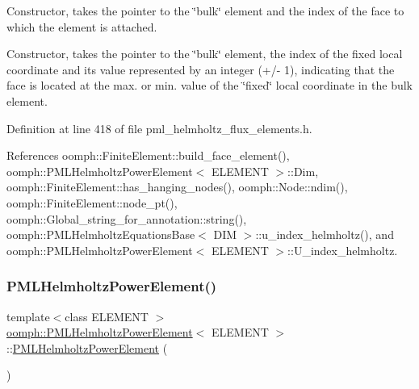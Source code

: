 Constructor, takes the pointer to the \char`\"{}bulk\char`\"{} element and the index of the face to which the element is attached. 

Constructor, takes the pointer to the \char`\"{}bulk\char`\"{} element, the index of the fixed local coordinate and its value represented by an integer (+/-\/ 1), indicating that the face is located at the max. or min. value of the \char`\"{}fixed\char`\"{} local coordinate in the bulk element. 

Definition at line 418 of file pml\+\_\+helmholtz\+\_\+flux\+\_\+elements.\+h.



References oomph\+::\+Finite\+Element\+::build\+\_\+face\+\_\+element(), oomph\+::\+P\+M\+L\+Helmholtz\+Power\+Element$<$ E\+L\+E\+M\+E\+N\+T $>$\+::\+Dim, oomph\+::\+Finite\+Element\+::has\+\_\+hanging\+\_\+nodes(), oomph\+::\+Node\+::ndim(), oomph\+::\+Finite\+Element\+::node\+\_\+pt(), oomph\+::\+Global\+\_\+string\+\_\+for\+\_\+annotation\+::string(), oomph\+::\+P\+M\+L\+Helmholtz\+Equations\+Base$<$ D\+I\+M $>$\+::u\+\_\+index\+\_\+helmholtz(), and oomph\+::\+P\+M\+L\+Helmholtz\+Power\+Element$<$ E\+L\+E\+M\+E\+N\+T $>$\+::\+U\+\_\+index\+\_\+helmholtz.

\mbox{\label{classoomph_1_1PMLHelmholtzPowerElement_a84f1714b98197b3f22b5784cd682fb29}} 
\subsubsection{\texorpdfstring{P\+M\+L\+Helmholtz\+Power\+Element()}{PMLHelmholtzPowerElement()}\hspace{0.1cm}{\footnotesize\ttfamily [2/3]}}
{\footnotesize\ttfamily template$<$class E\+L\+E\+M\+E\+NT $>$ \\
\hyperlink{classoomph_1_1PMLHelmholtzPowerElement}{oomph\+::\+P\+M\+L\+Helmholtz\+Power\+Element}$<$ E\+L\+E\+M\+E\+NT $>$\+::\hyperlink{classoomph_1_1PMLHelmholtzPowerElement}{P\+M\+L\+Helmholtz\+Power\+Element} (\begin{DoxyParamCaption}{ }\end{DoxyParamCaption})\hspace{0.3cm}{\ttfamily [inline]}}



